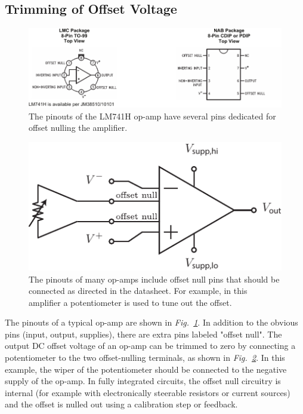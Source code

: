 \subsection{Trimming of Offset Voltage}
\begin{figure}[tb]
\centering
\includegraphics[width=1\columnwidth]{lm741_pinout}
\caption{The pinouts of the LM741H op-amp have several pins dedicated for offset nulling the amplifier.} \label{fig:lm741_pinout}
\end{figure}
\begin{figure}[tb]
\centering
\includegraphics[scale=1]{opamp_pinout_offset}
\caption{The pinouts of many op-amps include offset null pins that should be connected as directed in the datasheet.  For example, in this amplifier a potentiometer is used to tune out the offset.} \label{fig:opamp_pinout_offset}
\end{figure}
The pinouts of a typical op-amp are shown in \emph{Fig.~\ref{fig:lm741_pinout}}.  In addition to the obvious pins (input, output, supplies), there are extra pins labeled "offset null".   The output DC offset voltage of an op-amp can be trimmed to zero by connecting a potentiometer to the two offset-nulling terminals, as shown in \emph{Fig.~\ref{fig:opamp_pinout_offset}}. In this example, the wiper of the potentiometer should be connected to the negative supply of the op-amp.  In fully integrated circuits, the offset null circuitry is internal (for example with electronically steerable resistors or current sources) and the offset is nulled out using a calibration step or feedback.  
